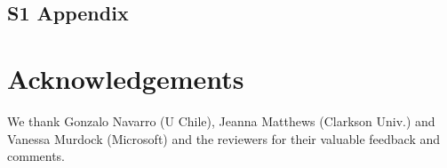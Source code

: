 \documentclass[10pt,letterpaper]{article}
\begin{document}
\subsection*{S1 Appendix}

\section*{Acknowledgements}
We thank Gonzalo Navarro (U Chile), 
Jeanna Matthews (Clarkson Univ.) and Vanessa Murdock (Microsoft) 
and the reviewers for their valuable feedback and comments.


\nolinenumbers


\end{document}
